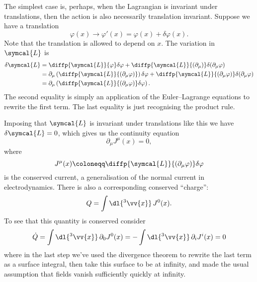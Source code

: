 \documentclass[fleqn]{NotesClass}
\newcommand{\lagrangianDensity}{\symcal{L}}
\begin{document}
    The simplest case is, perhaps, when the Lagrangian is invariant under translations, then the action is also necessarily translation invariant.
    Suppose we have a translation
    \begin{equation}
        \varphi(x) \to \varphi'(x) = \varphi(x) + \delta \varphi(x).
    \end{equation}
    Note that the translation is allowed to depend on \(x\).
    The variation in \(\lagrangianDensity\) is
    \begin{align}
        \delta \lagrangianDensity &= \diffp{\lagrangianDensity}{\varphi} \delta\varphi + \diffp{\lagrangianDensity}{(\partial_\mu)} \delta(\partial_\mu \varphi)\\
        &= \partial_\mu \left( \diffp{\lagrangianDensity}{(\partial_\mu\varphi)} \right) \delta \varphi + \diffp{\lagrangianDensity}{(\partial_\mu\varphi)} \delta(\partial_\mu\varphi)\\
        &= \partial_\mu\left( \diffp{\lagrangianDensity}{(\partial_\mu \varphi)} \delta \varphi \right).
    \end{align}
    The second equality is simply an application of the Euler--Lagrange equations to rewrite the first term.
    The last equality is just recognising the product rule.
    
    Imposing that \(\lagrangianDensity\) is invariant under translations like this we have \(\delta \lagrangianDensity = 0\), which gives us the continuity equation
    \begin{equation}
        \partial_\mu J^\mu(x) = 0,
    \end{equation}
    where
    \begin{equation}
        J^\mu(x) \coloneqq \diffp{\lagrangianDensity}{(\partial_\mu \varphi)} \delta \varphi
    \end{equation}
    is the conserved current, a generalisation of the normal current in electrodynamics.
    There is also a corresponding conserved \enquote{charge}:
    \begin{equation}
        Q = \int\dl{^3\vv{x}} \, J^0(x).
    \end{equation}
    To see that this quantity is conserved consider
    \begin{equation}
        \dot{Q} = \int \dl{^3\vv{x}} \, \partial_0 J^0(x) = -\int \dl{^3\vv{x}} \, \partial_i J^i(x) = 0
    \end{equation}
    where in the last step we've used the divergence theorem to rewrite the last term as a surface integral, then take this surface to be at infinity, and made the usual assumption that fields vanish sufficiently quickly at infinity.
    
\end{document}
